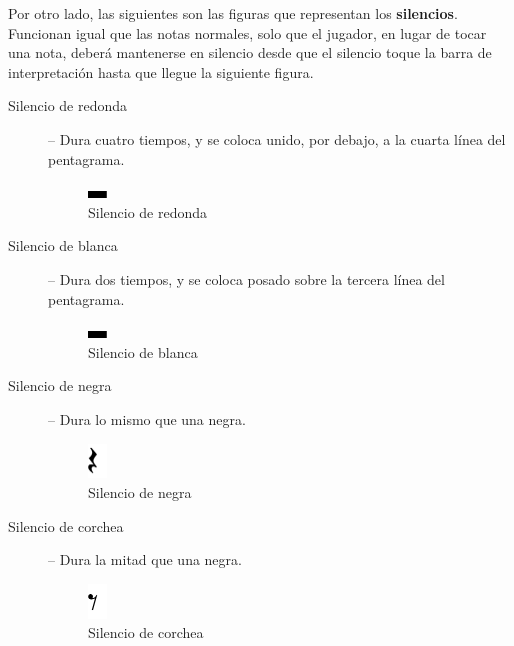 Por otro lado, las siguientes son las figuras que representan los
\textbf{silencios}. Funcionan igual que las notas normales, solo que el jugador,
en lugar de tocar una nota, deberá mantenerse en silencio desde que el silencio
toque la barra de interpretación hasta que llegue la siguiente figura.

\begin{description}
\item[Silencio de redonda] -- Dura cuatro tiempos, y se coloca unido, por
  debajo, a la cuarta línea del pentagrama.

\begin{figure}[h!]
  \centering
  \includegraphics[width=0.05\textwidth]{apendice_manual_usuario/imagen_silBlanca}
  \caption{Silencio de redonda}
\end{figure}


\item[Silencio de blanca] -- Dura dos tiempos, y se coloca posado sobre la
  tercera línea del pentagrama.

\begin{figure}[h!]
  \centering
  \includegraphics[width=0.05\textwidth]{apendice_manual_usuario/imagen_silBlanca}
  \caption{Silencio de blanca}
\end{figure}


\item[Silencio de negra] -- Dura lo mismo que una negra.
\begin{figure}[h!]
  \centering
  \includegraphics[width=0.05\textwidth]{apendice_manual_usuario/imagen_silNegra}
  \caption{Silencio de negra}
\end{figure}

\item[Silencio de corchea] -- Dura la mitad que una negra.
\begin{figure}[h!]
  \centering
  \includegraphics[width=0.05\textwidth]{apendice_manual_usuario/imagen_silCorchea}
  \caption{Silencio de corchea}
\end{figure}
\end{description}

